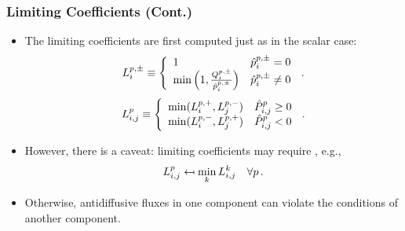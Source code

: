 \documentclass{beamer} \useoutertheme{infolines}
\begin{document}
\begin{frame}
\frametitle{Limiting Coefficients (Cont.)}

\begin{itemize}
  \item The limiting coefficients are first computed just as in the scalar case:
    \begin{equation}
      L_i^{p,\pm} \equiv\left\{
        \begin{array}{l l}
          1 & \hat{p}_i^{p,\pm} = 0\\
          \min\left(1,\frac{Q_i^{p,\pm}}
            {\hat{p}_i^{p,\pm}}\right) &
          \hat{p}_i^{p,\pm} \ne 0
        \end{array}
      \right. \,.
    \end{equation}
    \begin{equation}
      \limiterletter\ij^\componentindex \equiv\left\{
        \begin{array}{l l}
          \min(L_i^{\componentindex,+},L_j^{\componentindex,-}) &
            \hat{\correctionfluxentry}\ij^\componentindex \geq 0\\
          \min(L_i^{\componentindex,-},L_j^{\componentindex,+}) &
            \hat{\correctionfluxentry}\ij^\componentindex < 0
        \end{array}
      \right. \eqp
    \end{equation}
  \item However, there is a caveat: limiting coefficients may require
    , e.g.,
    \begin{equation}
      L_{i,j}^p \mapsfrom
        \min\limits_kL_{i,j}^k \quad \forall p \,.
    \end{equation}
  \item Otherwise, antidiffusive fluxes in one component can violate the
    conditions of another component.
\end{itemize}

\end{frame}
\end{document}
